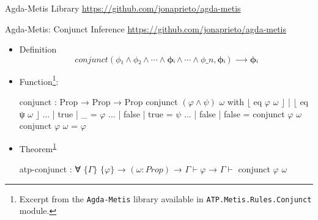 \documentclass[xetex, hyperref={pdfpagelabels=false}]{beamer}
\begin{document}
\begin{frame}[fragile, label=agda-metis]{Agda-Metis Library}
  {\url{https://github.com/jonaprieto/agda-metis}}
\vfill
\begin{table}[!ht]
\begin{center}
\end{center}
\label{tab:agda-metis-table}
\end{table}
\vfill
\end{frame}


\begin{frame}[fragile, label=atp-conjunct]{Agda-Metis: Conjunct Inference}
   {\url{https://github.com/jonaprieto/agda-metis}}
\begin{itemize}
\item Definition
  \begin{equation*}
  conjunct (ϕ₁ ∧  ϕ₂ ∧ ⋯ ∧ \mathbf{ϕᵢ} ∧ ⋯ ∧ ϕ\_n, \mathbf{ϕᵢ}) ⟶ \mathbf{ϕᵢ}
  \end{equation*}

\item Function\footnote{\label{note-conjunct}Excerpt from the \texttt{Agda-Metis} library available in  \texttt{ATP.Metis.Rules.Conjunct} module.}:
\begin{agda}
conjunct : Prop → Prop → Prop
conjunct $(φ \wedge ψ)$ $ω$ with $⌊$ eq $φ$ $ω$ $⌋$ | $⌊$ eq ψ $ω$ $⌋$
... | true  | _     = $φ$
... | false | true  = $ψ$
... | false | false = conjunct $φ$ $ω$
conjunct $φ$ $ω$       = $φ$
\end{agda}
\item Theorem\textsuperscript{\ref{note-conjunct}}
\begin{agda}
atp-conjunct
  : ∀ $\{Γ\}$ $\{φ\}$
  → $(ω : Prop)$
  → $Γ \vdash φ$
  → $Γ \vdash$ conjunct $φ$ $ω$
\end{agda}
\end{itemize}
\end{frame}
\end{document}

